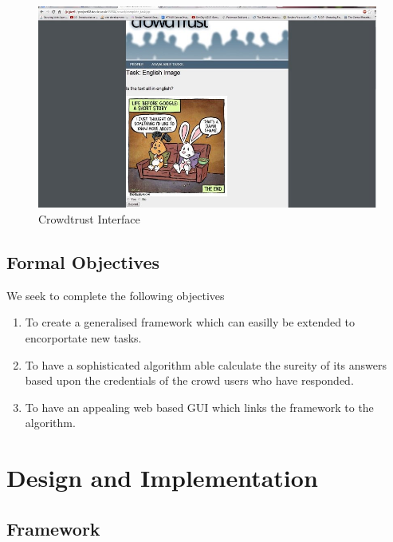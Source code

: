 \documentclass[11pt]{article}
\begin{document}
\begin{figure}[H]
\begin{center}
\includegraphics[width=\linewidth]{images/crowdtrustinterface.jpg}
\caption{Crowdtrust Interface}
\label{default}
\end{center}
\end{figure}

\subsection{Formal Objectives}
We seek to complete the following objectives
\begin{enumerate}
\item
To create a generalised framework which can easilly be extended to encorportate
new tasks.
\item
To have a sophisticated algorithm able calculate the sureity of its answers based
upon the credentials of the crowd users who have responded.
\item
To have an appealing web based GUI which links the framework to the algorithm.
\end{enumerate}



\section{Design and Implementation}
\subsection{Framework}
\end{document}
